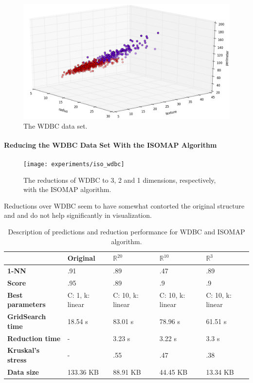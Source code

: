 \begin{figure}[H]
	\centering
	\includegraphics[width=\linewidth]{img/datasets/wdbc}
	\captionsetup{justification=centering}
	\caption{The WDBC data set.}
	\label{fig:dswdbc}
\end{figure}

\newpage
\paragraph{Reducing the WDBC Data Set With the ISOMAP Algorithm}

\begin{figure}[H]
	\centering
	\captionsetup{justification=centering}
	\texttt{[image: experiments/iso\_wdbc]}
	\caption{The reductions of WDBC to 3, 2 and 1 dimensions, respectively, with the ISOMAP algorithm.}
	\label{fig:dswdbciso}
\end{figure}

Reductions over WDBC seem to have somewhat contorted the original structure and and do not help significantly in visualization.

\begin{table}[H]
	\centering
	
	\begin{tabular}{|p{.15\linewidth}|p{.15\linewidth}|p{.15\linewidth}|p{.15\linewidth}|p{.15\linewidth}|}
		\hline
		& \textbf{Original} & $\mathbb{R}^{20}$ & $\mathbb{R}^{10}$ & $\mathbb{R}^{3}$ \\\hline
		\textbf{1-NN} & .91 & .89 & .47 & .89 \\\hline
		\textbf{Score} & .95 & .89 & .9 & .9 \\\hline
		\textbf{Best parameters} & C: 1, k: linear & C: 10, k: linear & C: 10, k: linear & C: 10, k: linear \\\hline
		\textbf{GridSearch time} & 18.54 s & 83.01 s & 78.96 s & 61.51 s \\\hline
		\textbf{Reduction time} & - & 3.23 s & 3.22 s & 3.3 s \\\hline
		\textbf{Kruskal's stress} & - & .55 & .47 & .38 \\\hline
		\textbf{Data size} & 133.36 KB & 88.91 KB & 44.45 KB & 13.34 KB \\\hline
	\end{tabular}
	\captionsetup{justification=centering}
	\caption{Description of predictions and reduction performance for WDBC and ISOMAP algorithm.}
\end{table}

